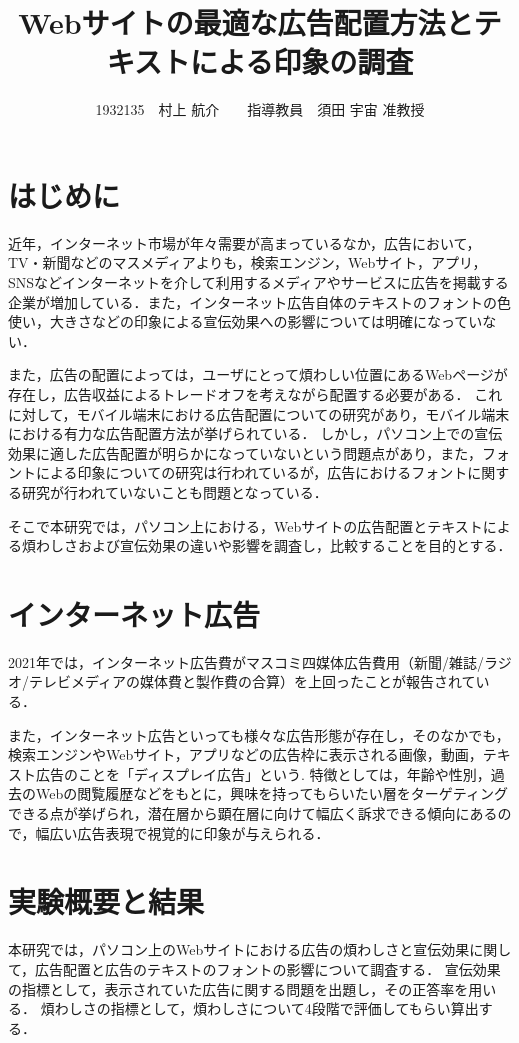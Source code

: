 \documentclass[twocolumn,10pt,a4j]{ltjsarticle}
\title{Webサイトの最適な広告配置方法とテキストによる印象の調査}
\author{1932135　村上 航介　　指導教員　須田 宇宙 准教授}
\date{}
\begin{document}
\maketitle

\section{はじめに}
近年，インターネット市場が年々需要が高まっているなか，広告において，TV・新聞などのマスメディアよりも，検索エンジン，Webサイト，アプリ，SNSなどインターネットを介して利用するメディアやサービスに広告を掲載する企業が増加している．また，インターネット広告自体のテキストのフォントの色使い，大きさなどの印象による宣伝効果への影響については明確になっていない．

また，広告の配置によっては，ユーザにとって煩わしい位置にあるWebページが存在し，広告収益によるトレードオフを考えながら配置する必要がある．
これに対して，モバイル端末における広告配置についての研究があり，モバイル端末における有力な広告配置方法が挙げられている\cite{mobile}．
しかし，パソコン上での宣伝効果に適した広告配置が明らかになっていないという問題点があり，また，フォントによる印象についての研究は行われているが，広告におけるフォントに関する研究が行われていないことも問題となっている．

そこで本研究では，パソコン上における，Webサイトの広告配置とテキストによる煩わしさおよび宣伝効果の違いや影響を調査し，比較することを目的とする．

\section{インターネット広告}
2021年では，インターネット広告費がマスコミ四媒体広告費用（新聞/雑誌/ラジオ/テレビメディアの媒体費と製作費の合算）を上回ったことが報告されている\cite{dentsu}．

また，インターネット広告といっても様々な広告形態が存在し，そのなかでも，検索エンジンやWebサイト，アプリなどの広告枠に表示される画像，動画，テキスト広告のことを「ディスプレイ広告」という.
特徴としては，年齢や性別，過去のWebの閲覧履歴などをもとに，興味を持ってもらいたい層をターゲティングできる点が挙げられ，潜在層から顕在層に向けて幅広く訴求できる傾向にあるので，幅広い広告表現で視覚的に印象が与えられる．

\section{実験概要と結果}
本研究では，パソコン上のWebサイトにおける広告の煩わしさと宣伝効果に関して，広告配置と広告のテキストのフォントの影響について調査する．
宣伝効果の指標として，表示されていた広告に関する問題を出題し，その正答率を用いる．
煩わしさの指標として，煩わしさについて4段階で評価してもらい算出する．
\end{document}
